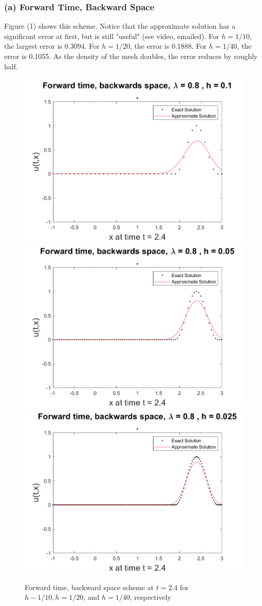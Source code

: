 \documentclass[12pt]{article}
\begin{document}
\subsubsection*{(a) Forward Time, Backward Space}
\vspace{-1mm}
Figure (1) shows this scheme. Notice that the approximate solution has a significant error at first, but is still "useful" (see video, emailed). For $h=1/10$, the largest error is 0.3094. For $h=1/20$, the error is 0.1888. For $h=1/40$, the error is 0.1055. As the density of the mesh doubles, the error reduces by roughly half.

\begin{figure}
	\centering
	\includegraphics[width=.6\linewidth]{./code/a_forward_time_backward_space_1_10th.png}	\includegraphics[width=.6\linewidth]{./code/a_forward_time_backward_space_1_20th.png}
	\includegraphics[width=.6\linewidth]{./code/a_forward_time_backward_space_1_40th.png}
	\caption{Forward time, backward space scheme at $t=2.4$ for $h-1/10, h=1/20$, and $h=1/40$, respectively}
\end{figure}
\end{document}
